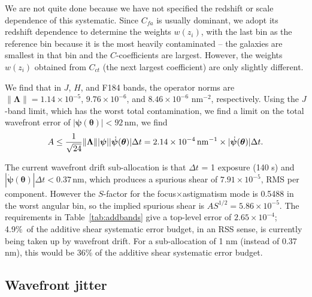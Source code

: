 \documentclass[aps,prd, amsmath,amssymb,superscriptaddress,showkeys,nofootinbib,reprint,preprintnumbers]{revtex4-1}
\begin{document}
We are not quite done because we have not specified the redshift or
scale dependence of this systematic. Since $C_{fa}$ is usually
dominant, we adopt its redshift dependence to determine the weights
$w(z_i)$, with the last bin as the reference bin because it is the
most heavily contaminated -- the galaxies are smallest in that bin and
the $C$-coefficients are largest. However, the weights $w(z_i)$
obtained from $C_{ct}$ (the next largest coefficient) are only
slightly different.

We find that in $J$, $H$, and F184 bands, the operator norms are $\lVert{\boldsymbol\Lambda}\rVert = 1.14\times 10^{-5}$, $9.76\times 10^{-6}$, and $8.46\times 10^{-6}$ nm$^{-2}$, respectively. Using the $J$-band limit, which has the worst total contamination, we find a limit on the total wavefront error of
$|{\boldsymbol\psi}({\boldsymbol\theta})|<92\,$nm, we find
\begin{equation}
A \le \frac1{\sqrt{24}}\lVert{\boldsymbol\Lambda} \rVert |{\boldsymbol\psi}| |\dot{\boldsymbol\psi}({\boldsymbol\theta})| \Delta t
= 2.14\times 10^{-4}\, {\rm nm}^{-1}\times |\dot{\boldsymbol\psi}({\boldsymbol\theta})| \Delta t.
\end{equation}

The current wavefront drift sub-allocation is that $\Delta t$ = 1 exposure
(140 s) and $|\dot{\boldsymbol\psi}({\boldsymbol\theta})| \Delta
t<0.37\,$nm, which produces a spurious shear of $7.91\times 10^{-5}$,
RMS per component. However the $S$-factor for the
focus$\times$astigmatism mode is 0.5488 in the worst angular bin, so the
implied spurious shear is $AS^{1/2} = 5.86\times 10^{-5}$. The
requirements in Table~\ref{tab:addbands} give a top-level error of
$2.65\times 10^{-4}$; 4.9\%\ of the additive shear systematic error budget, in
an RSS sense, is currently being taken up by wavefront drift. For a sub-allocation of 1 nm (instead of 0.37 nm), this would be 36\% of the additive shear systematic error budget.

\subsection{Wavefront jitter}
\label{as:a-wfjitter}
\end{document}
